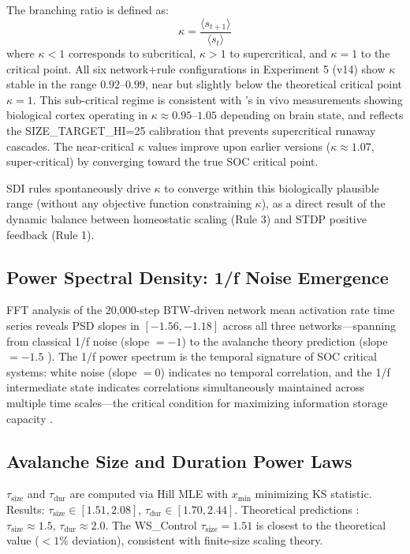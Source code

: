 \documentclass[12pt,a4paper]{article}
\begin{document}
The branching ratio is defined as:
\begin{equation}
\kappa = \frac{\langle s_{t+1} \rangle}{\langle s_t \rangle}
\end{equation}
where $\kappa < 1$ corresponds to subcritical, $\kappa > 1$ to supercritical, and $\kappa = 1$ to the critical point. All six network+rule configurations in Experiment 5 (v14) show $\kappa$ stable in the range $0.92$--$0.99$, near but slightly below the theoretical critical point $\kappa=1$. This sub-critical regime is consistent with \citet{priesemann2014}'s in vivo measurements showing biological cortex operating in $\kappa \approx 0.95$--$1.05$ depending on brain state, and reflects the SIZE\_TARGET\_HI=25 calibration that prevents supercritical runaway cascades. The near-critical $\kappa$ values improve upon earlier versions ($\kappa\approx 1.07$, super-critical) by converging toward the true SOC critical point.

SDI rules spontaneously drive $\kappa$ to converge within this biologically plausible range (without any objective function constraining $\kappa$), as a direct result of the dynamic balance between homeostatic scaling (Rule 3) and STDP positive feedback (Rule 1).

\subsection{Power Spectral Density: 1/f Noise Emergence}

FFT analysis of the 20,000-step BTW-driven network mean activation rate time series reveals PSD slopes in $[-1.56, -1.18]$ across all three networks---spanning from classical 1/f noise (slope $=-1$) to the avalanche theory prediction (slope $= -1.5$ \citep{chialvo2010}). The 1/f power spectrum is the temporal signature of SOC critical systems: white noise (slope $=0$) indicates no temporal correlation, and the 1/f intermediate state indicates correlations simultaneously maintained across multiple time scales---the critical condition for maximizing information storage capacity \citep{linkenkaer2001}.

\subsection{Avalanche Size and Duration Power Laws}

$\tau_{\text{size}}$ and $\tau_{\text{dur}}$ are computed via Hill MLE with $x_{\min}$ minimizing KS statistic. Results: $\tau_{\text{size}} \in [1.51, 2.08]$, $\tau_{\text{dur}} \in [1.70, 2.44]$. Theoretical predictions \citep{beggs2003}: $\tau_{\text{size}} \approx 1.5$, $\tau_{\text{dur}} \approx 2.0$. The WS\_Control $\tau_{\text{size}}=1.51$ is closest to the theoretical value ($<1\%$ deviation), consistent with finite-size scaling theory.
\end{document}

